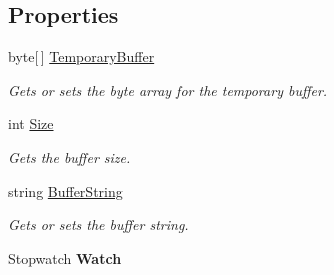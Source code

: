 \subsection*{Properties}
\begin{DoxyCompactItemize}
\item 
\hypertarget{classAsterion_1_1Buffer_a39d4db24973d108ccb34aa8e626db1f2}{byte\mbox{[}$\,$\mbox{]} \hyperlink{classAsterion_1_1Buffer_a39d4db24973d108ccb34aa8e626db1f2}{Temporary\-Buffer}}\label{classAsterion_1_1Buffer_a39d4db24973d108ccb34aa8e626db1f2}

\begin{DoxyCompactList}\small\item\em Gets or sets the byte array for the temporary buffer. \end{DoxyCompactList}\item 
\hypertarget{classAsterion_1_1Buffer_a0361e670e91aeeef4f5b7c9b0a251dd7}{int \hyperlink{classAsterion_1_1Buffer_a0361e670e91aeeef4f5b7c9b0a251dd7}{Size}}\label{classAsterion_1_1Buffer_a0361e670e91aeeef4f5b7c9b0a251dd7}

\begin{DoxyCompactList}\small\item\em Gets the buffer size. \end{DoxyCompactList}\item 
\hypertarget{classAsterion_1_1Buffer_a753913b5dc1768733e63029fd36d538a}{string \hyperlink{classAsterion_1_1Buffer_a753913b5dc1768733e63029fd36d538a}{Buffer\-String}}\label{classAsterion_1_1Buffer_a753913b5dc1768733e63029fd36d538a}

\begin{DoxyCompactList}\small\item\em Gets or sets the buffer string. \end{DoxyCompactList}\item 
\hypertarget{classAsterion_1_1Buffer_a91b14baa133cf47fc9f16598123ad606}{Stopwatch {\bfseries Watch}}\label{classAsterion_1_1Buffer_a91b14baa133cf47fc9f16598123ad606}

\end{DoxyCompactItemize}


